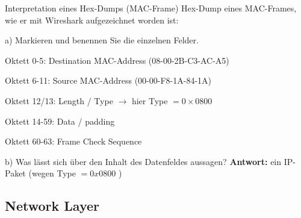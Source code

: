 \begin{example2}{Interpretation eines Hex-Dumps (MAC-Frame)}
  Hex-Dump eines MAC-Frames, wie er mit Wireshark aufgezeichnet worden ist:

  \vspace{1mm}


\vspace{1mm}

a) Markieren und benennen Sie die einzelnen Felder.

Oktett 0-5: Destination MAC-Address (08-00-2B-C3-AC-A5)

Oktett 6-11: Source MAC-Address (00-00-F8-1A-84-1A)

Oktett 12/13: Length / Type $\rightarrow$ hier Type $=0 \times 0800$

Oktett 14-59: Data / padding

Oktett 60-63: Frame Check Sequence

b) Was lässt sich über den Inhalt des Datenfeldes aussagen?
\textbf{Antwort:}
ein IP-Paket (wegen Type $=0 x 0800$ )
\end{example2}


\subsection*{Network Layer}

